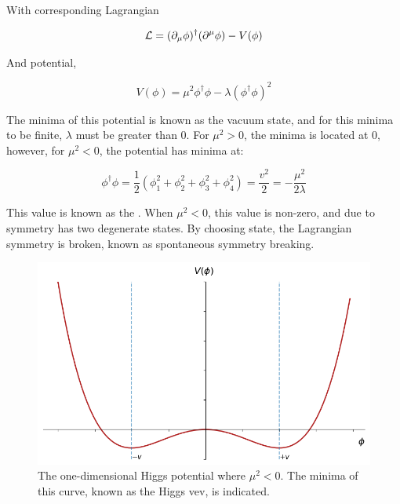 With corresponding Lagrangian

\begin{equation} \label{higgs-lagrangian}
    \mathcal{L} = (\partial_{\mu}\phi)^\dagger (\partial^{\mu}\phi) - V(\phi)\\
\end{equation}

And potential,

\begin{equation} \label{higgs-potential}
    V(\phi) = \mu^2\phi^\dagger \phi - \lambda(\phi^\dagger \phi)^2
\end{equation}

The minima of this potential is known as the vacuum state, and for this minima to be finite, $\lambda$ must be greater than 0. For $\mu^2 >0$, the minima is located at 0, however, for $\mu^2<0$, the potential has minima at:

\begin{equation}
    \phi^\dagger \phi = \frac{1}{2}(\phi_{1}^{2}+\phi_{2}^{2}+\phi_{3}^{2}+\phi_{4}^{2}) = \frac{v^2}{2} = -\frac{\mu^2}{2\lambda}
\end{equation}

This value is known as the . When $\mu^2 < 0$, this value is non-zero, and due to symmetry has two degenerate states. By choosing state, the Lagrangian symmetry is broken, known as spontaneous symmetry breaking.

\begin{figure}[!ht]
    \centering
    \includegraphics[width=\textwidth]{chapters/chapter1_theory/images/higgs-2d-vev.png}
    \caption{The one-dimensional Higgs potential where $\mu^2 <0$. The minima of this curve, known as the Higgs \gls{vev}, is indicated.}
    \label{fig:higgs-potential}
\end{figure}


